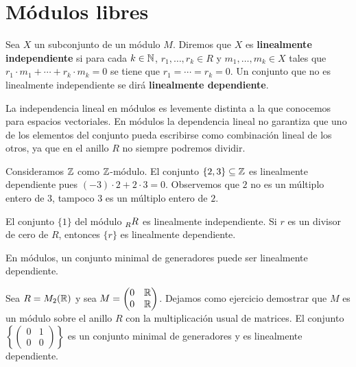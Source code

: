 \chapter{Módulos libres}

\begin{definition}
Sea $X$ un subconjunto de un módulo $M$. Diremos que $X$ es \textbf{linealmente independiente}
si para cada $k\in\mathbb{N}$, $r_1,\dots,r_k\in R$ y $m_1,\dots,m_k\in X$ tales que 
$r_1\cdot m_1+\cdots+r_k\cdot m_k=0$ se tiene que $r_1=\cdots=r_k=0$. 
Un conjunto que no es linealmente independiente se dirá \textbf{linealmente dependiente}.\end{definition}

La independencia lineal en módulos es levemente distinta a la que conocemos para
espacios vectoriales. En módulos la dependencia lineal no garantiza que uno de los elementos del conjunto
pueda escribirse como combinación lineal de los otros, ya que en el anillo $R$ no siempre podremos dividir.

\begin{example}
Consideramos $\mathbb{Z}$ como $\mathbb{Z}$-módulo. 
El conjunto $\{2,3\}\subseteq\mathbb{Z}$ es linealmente dependiente pues $(-3)\cdot 2+2\cdot 3=0$. Observemos
que $2$ no es un múltiplo entero de $3$, tampoco $3$ es un múltiplo entero de $2$.   	
\end{example}

\begin{example}
El conjunto $\{1\}$ del módulo $\prescript{}{R}R$ es linealmente independiente. Si $r$ es un 
divisor de cero de $R$, entonces $\{r\}$ es linealmente dependiente.	
\end{example}

En módulos, un conjunto minimal de generadores puede ser linealmente dependiente. 

\begin{example}
Sea $R=M_2(\mathbb{R})$ y sea $M=\begin{pmatrix} 0 & \mathbb{R}\\ 0 & \mathbb{R}\end{pmatrix}$. Dejamos como ejercicio demostrar
que $M$ es un módulo sobre el anillo $R$ con la multiplicación usual de matrices. 
El conjunto $\left\{\begin{pmatrix} 0&1\\0&0\end{pmatrix}\right\}$ es un 
conjunto minimal de generadores y es linealmente dependiente. 	
\end{example}

